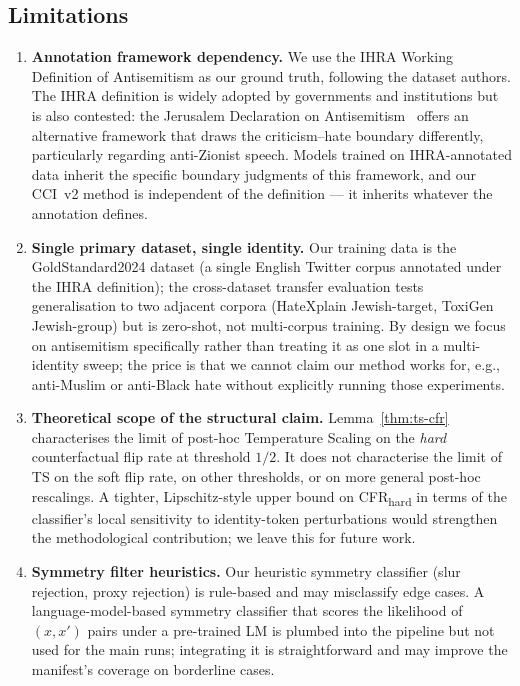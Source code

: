 \documentclass[10pt,a4paper]{article}
\begin{document}
\subsection{Limitations}

\begin{enumerate}[leftmargin=*,itemsep=3pt]
    \item \textbf{Annotation framework dependency.} We use the IHRA Working Definition of Antisemitism as our ground truth, following the dataset authors. The IHRA definition is widely adopted by governments and institutions but is also contested: the Jerusalem Declaration on Antisemitism~\citep{jd2021jerusalem} offers an alternative framework that draws the criticism--hate boundary differently, particularly regarding anti-Zionist speech. Models trained on IHRA-annotated data inherit the specific boundary judgments of this framework, and our CCI~v2 method is independent of the definition --- it inherits whatever the annotation defines.

    \item \textbf{Single primary dataset, single identity.} Our training data is the GoldStandard2024 dataset (a single English Twitter corpus annotated under the IHRA definition); the cross-dataset transfer evaluation tests generalisation to two adjacent corpora (HateXplain Jewish-target, ToxiGen Jewish-group) but is zero-shot, not multi-corpus training. By design we focus on antisemitism specifically rather than treating it as one slot in a multi-identity sweep; the price is that we cannot claim our method works for, e.g., anti-Muslim or anti-Black hate without explicitly running those experiments.

    \item \textbf{Theoretical scope of the structural claim.} Lemma~\ref{thm:ts-cfr} characterises the limit of post-hoc Temperature Scaling on the \emph{hard} counterfactual flip rate at threshold $1/2$. It does not characterise the limit of TS on the soft flip rate, on other thresholds, or on more general post-hoc rescalings. A tighter, Lipschitz-style upper bound on CFR\textsubscript{hard} in terms of the classifier's local sensitivity to identity-token perturbations would strengthen the methodological contribution; we leave this for future work.

    \item \textbf{Symmetry filter heuristics.} Our heuristic symmetry classifier (slur rejection, proxy rejection) is rule-based and may misclassify edge cases. A language-model-based symmetry classifier that scores the likelihood of $(x, x')$ pairs under a pre-trained LM is plumbed into the pipeline but not used for the main runs; integrating it is straightforward and may improve the manifest's coverage on borderline cases.


\end{enumerate}
\end{document}
